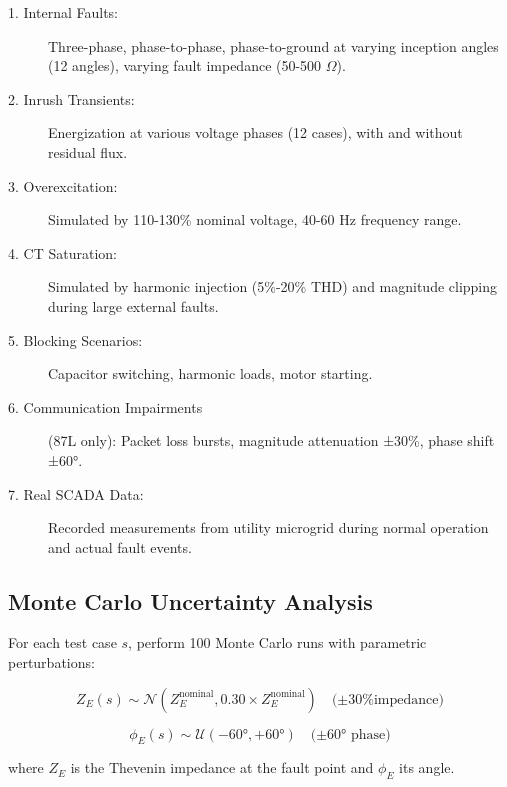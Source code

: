 \documentclass[12pt,a4paper]{article}
\begin{document}
\begin{description}
    \item[1. Internal Faults:] Three-phase, phase-to-phase, phase-to-ground at varying 
    inception angles (12 angles), varying fault impedance (50-500 $\Omega$).
    
    \item[2. Inrush Transients:] Energization at various voltage phases (12 cases), 
    with and without residual flux.
    
    \item[3. Overexcitation:] Simulated by 110-130\% nominal voltage, 40-60 Hz frequency 
    range.
    
    \item[4. CT Saturation:] Simulated by harmonic injection (5\%-20\% THD) and magnitude 
    clipping during large external faults.
    
    \item[5. Blocking Scenarios:] Capacitor switching, harmonic loads, motor starting.
    
    \item[6. Communication Impairments] (87L only): Packet loss bursts, magnitude 
    attenuation ±30\%, phase shift ±60°.
    
    \item[7. Real SCADA Data:] Recorded measurements from utility microgrid during 
    normal operation and actual fault events.
\end{description}

\subsection{Monte Carlo Uncertainty Analysis}
\label{subsec:monte_carlo}

For each test case $s$, perform 100 Monte Carlo runs with parametric perturbations:

\begin{equation}
Z_E(s) \sim \mathcal{N}(Z_E^{\text{nominal}}, 0.30 \times Z_E^{\text{nominal}}) \quad \text{(±30\% impedance)}
\label{eq:mc_impedance}
\end{equation}

\begin{equation}
\phi_E(s) \sim \mathcal{U}(-60°, +60°) \quad \text{(±60° phase)}
\label{eq:mc_phase}
\end{equation}

where $Z_E$ is the Thevenin impedance at the fault point and $\phi_E$ its angle.
\end{document}
